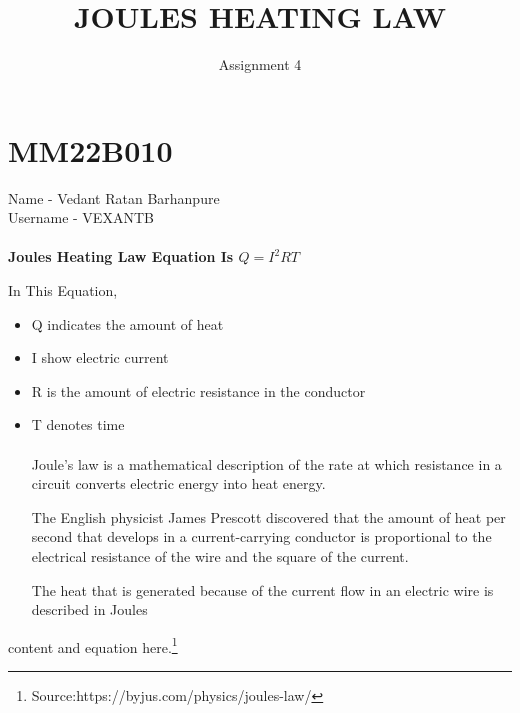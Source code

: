 \documentclass{article}
\title{JOULES HEATING LAW}
\date{Assignment 4}
\begin{document}
\maketitle
\section{MM22B010}
Name - Vedant Ratan Barhanpure
\\
Username - VEXANTB
\\
\\
\textbf{\Large Joules Heating Law Equation Is $Q=I^2RT$}
\newline

In This Equation,

\begin{itemize}

    \item Q indicates the amount of heat
    \item I show electric current
    \item R is the amount of electric resistance in the conductor
    \item T denotes time
\\
\\
    Joule’s law is a mathematical description of the rate at which resistance in a circuit converts electric energy into heat energy.

The English physicist James Prescott discovered that the amount of heat per second that develops in a current-carrying conductor is proportional to the electrical resistance of the wire and the square of the current.

The heat that is generated because of the current flow in an electric wire is described in Joules
\end{itemize}
content and equation here.\footnote{Source:https://byjus.com/physics/joules-law/}
\end{document}
